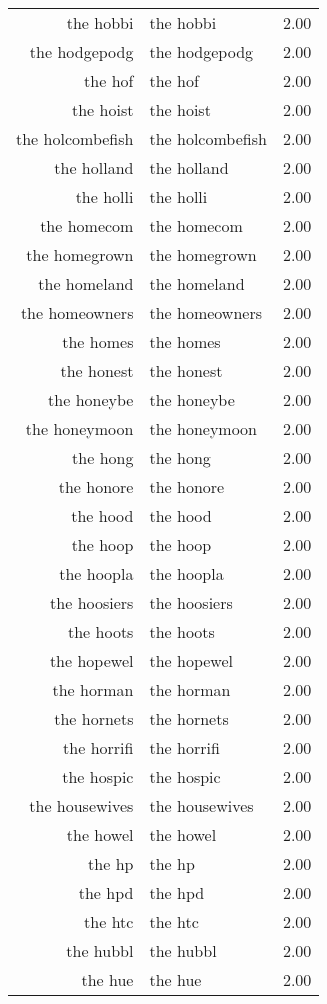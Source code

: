 \begin{table}[ht]
\begin{tabular}{rlr}
  the hobbi & the hobbi & 2.00 \\ 
  the hodgepodg & the hodgepodg & 2.00 \\ 
  the hof & the hof & 2.00 \\ 
  the hoist & the hoist & 2.00 \\ 
  the holcombefish & the holcombefish & 2.00 \\ 
  the holland & the holland & 2.00 \\ 
  the holli & the holli & 2.00 \\ 
  the homecom & the homecom & 2.00 \\ 
  the homegrown & the homegrown & 2.00 \\ 
  the homeland & the homeland & 2.00 \\ 
  the homeowners & the homeowners & 2.00 \\ 
  the homes & the homes & 2.00 \\ 
  the honest & the honest & 2.00 \\ 
  the honeybe & the honeybe & 2.00 \\ 
  the honeymoon & the honeymoon & 2.00 \\ 
  the hong & the hong & 2.00 \\ 
  the honore & the honore & 2.00 \\ 
  the hood & the hood & 2.00 \\ 
  the hoop & the hoop & 2.00 \\ 
  the hoopla & the hoopla & 2.00 \\ 
  the hoosiers & the hoosiers & 2.00 \\ 
  the hoots & the hoots & 2.00 \\ 
  the hopewel & the hopewel & 2.00 \\ 
  the horman & the horman & 2.00 \\ 
  the hornets & the hornets & 2.00 \\ 
  the horrifi & the horrifi & 2.00 \\ 
  the hospic & the hospic & 2.00 \\ 
  the housewives & the housewives & 2.00 \\ 
  the howel & the howel & 2.00 \\ 
  the hp & the hp & 2.00 \\ 
  the hpd & the hpd & 2.00 \\ 
  the htc & the htc & 2.00 \\ 
  the hubbl & the hubbl & 2.00 \\ 
  the hue & the hue & 2.00 \\ 

\end{tabular}
\end{table}
